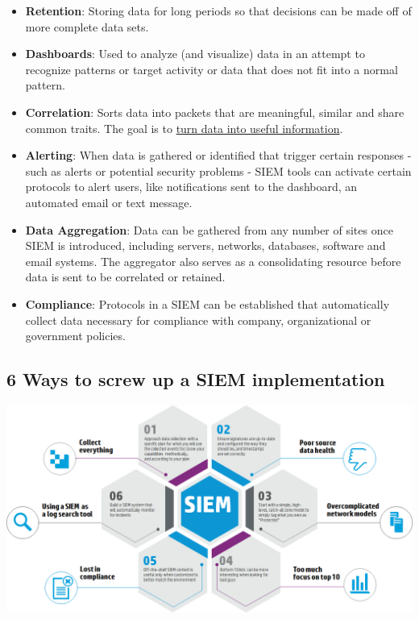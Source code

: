 \documentclass[a4]{article}
\begin{document}
\begin{multicols}{3}
\begin{itemize}
    \item \textbf{Retention}: Storing data for long periods so that decisions can be made off of more
    complete data sets.
    \item \textbf{Dashboards}: Used to analyze (and visualize) data in an attempt to recognize patterns
    or target activity or data that does not fit into a normal pattern.
    \item \textbf{Correlation}: Sorts data into packets that are meaningful, similar and share common
    traits. The goal is to \underline{turn data into useful information}.
    \item \textbf{Alerting}: When data is gathered or identified that trigger certain responses - such as
    alerts or potential security problems - SIEM tools can activate certain protocols to alert
    users, like notifications sent to the dashboard, an automated email or text message.
    \item \textbf{Data Aggregation}: Data can be gathered from any number of sites once SIEM is
    introduced, including servers, networks, databases, software and email systems. The
    aggregator also serves as a consolidating resource before data is sent to be
    correlated or retained.
    \item \textbf{Compliance}: Protocols in a SIEM can be established that automatically collect data
    necessary for compliance with company, organizational or government policies.
\end{itemize}

\subsection{6 Ways to screw up a SIEM implementation}
\begin{center}
    \begin{minipage}{\columnwidth}
        \includegraphics[width=\columnwidth]{screw-up-SIEM.png}
    \end{minipage}
\end{center}


\end{multicols}
\end{document}
